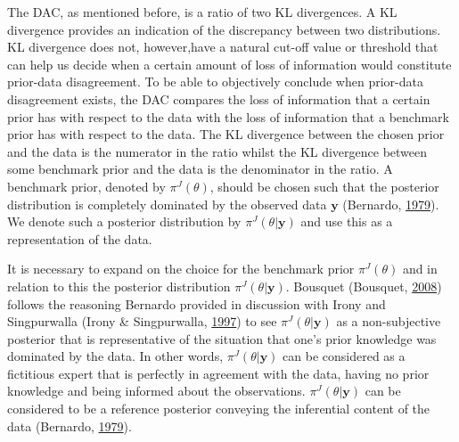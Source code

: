 \documentclass[openright,titlepage,12pt,a4paper]{book}
\begin{document}
The DAC, as mentioned before, is a ratio of two KL divergences. A KL divergence provides an indication of the discrepancy between two distributions. KL divergence does not, however,have a natural cut-off value or threshold that can help us decide when a certain amount of loss of information would constitute prior-data disagreement. To be able to objectively conclude when prior-data disagreement exists, the DAC compares the loss of information that a certain prior has with respect to the data with the loss of information that a benchmark prior has with respect to the data. The KL divergence between the chosen prior and the data is the numerator in the ratio whilst the KL divergence between some benchmark prior and the data is the denominator in the ratio. A benchmark prior, denoted by \(\pi^J(\theta)\), should be chosen such that the posterior distribution is completely dominated by the observed data \(\textbf{y}\) (Bernardo, \protect\hyperlink{ref-bernardo_reference_1979}{1979}). We denote such a posterior distribution by \(\pi^J(\theta|\textbf{y})\) and use this as a representation of the data.

\newpage

It is necessary to expand on the choice for the benchmark prior \(\pi^J(\theta)\) and in relation to this the posterior distribution \(\pi^J(\theta|\textbf{y})\). Bousquet (Bousquet, \protect\hyperlink{ref-bousquet_diagnostics_2008}{2008}) follows the reasoning Bernardo provided in discussion with Irony and Singpurwalla (Irony \& Singpurwalla, \protect\hyperlink{ref-irony_noninformative_1997}{1997}) to see \(\pi^J(\theta|\textbf{y})\) as a non-subjective posterior that is representative of the situation that one's prior knowledge was dominated by the data. In other words, \(\pi^J(\theta|\textbf{y})\) can be considered as a fictitious expert that is perfectly in agreement with the data, having no prior knowledge and being informed about the observations. \(\pi^J(\theta|\textbf{y})\) can be considered to be a reference posterior conveying the inferential content of the data (Bernardo, \protect\hyperlink{ref-bernardo_reference_1979}{1979}).
\end{document}
